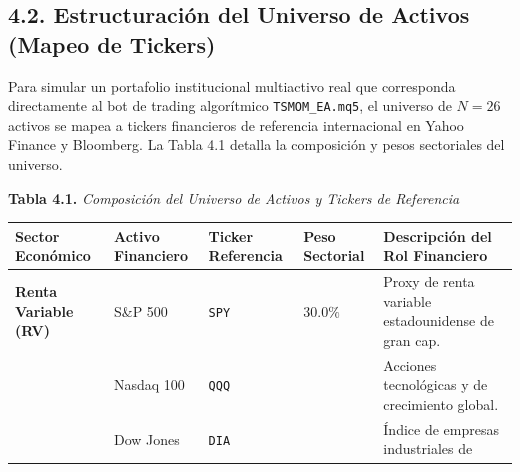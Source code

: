\documentclass[
  12pt,
]{article}
\newcounter{none} %
\begin{document}
\subsection{4.2. Estructuración del Universo de Activos (Mapeo de
Tickers)}\label{estructuraciuxf3n-del-universo-de-activos-mapeo-de-tickers}

Para simular un portafolio institucional multiactivo real que
corresponda directamente al bot de trading algorítmico
\texttt{TSMOM\_EA.mq5}, el universo de \(N=26\) activos se mapea a
tickers financieros de referencia internacional en Yahoo Finance y
Bloomberg. La Tabla 4.1 detalla la composición y pesos sectoriales del
universo.

\textbf{Tabla 4.1.} \emph{Composición del Universo de Activos y Tickers
de Referencia}

{\def\LTcaptype{none} %
\begin{longtable}[]{@{}
  >{\raggedright\arraybackslash}p{}
  >{\raggedright\arraybackslash}p{}
  >{\centering\arraybackslash}p{}
  >{\centering\arraybackslash}p{}
  >{\raggedright\arraybackslash}p{}@{}}
\toprule\noalign{}
\begin{minipage}[b]{\linewidth}\raggedright
Sector Económico
\end{minipage} & \begin{minipage}[b]{\linewidth}\raggedright
Activo Financiero
\end{minipage} & \begin{minipage}[b]{\linewidth}\centering
Ticker Referencia
\end{minipage} & \begin{minipage}[b]{\linewidth}\centering
Peso Sectorial
\end{minipage} & \begin{minipage}[b]{\linewidth}\raggedright
Descripción del Rol Financiero
\end{minipage} \\
\midrule\noalign{}
\endhead
\bottomrule\noalign{}
\endlastfoot
\textbf{Renta Variable (RV)} & S\&P 500 & \texttt{SPY} & \(30.0\%\) &
Proxy de renta variable estadounidense de gran cap. \\
& Nasdaq 100 & \texttt{QQQ} & & Acciones tecnológicas y de crecimiento
global. \\
& Dow Jones & \texttt{DIA} & & Índice de empresas industriales de

\end{longtable}}
\end{document}
